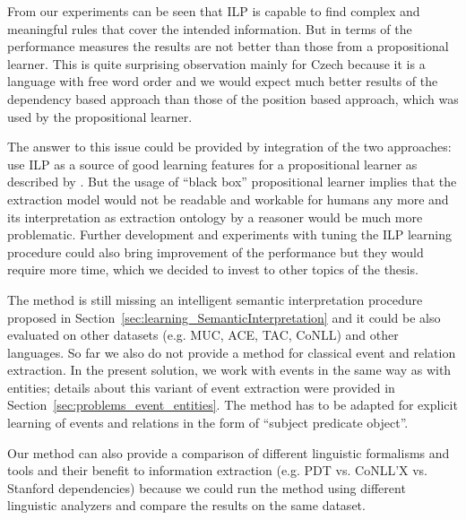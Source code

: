 From our experiments can be seen that ILP is capable to find complex and meaningful rules that cover the intended information. But in terms of the performance measures the results are not better than those from a propositional learner. This is quite surprising observation mainly for Czech because it is a language with free word order and we would expect much better results of the dependency based approach than those of the position based approach, which was used by the propositional learner.

The answer to this issue could be provided by integration of the two approaches: use ILP as a source of good learning features for a propositional learner as described by \cite{DBLP:conf/ilp/RamakrishnanJBS07}. But the usage of ``black box'' propositional learner implies that the extraction model would not be readable and workable for humans any more and its interpretation as extraction ontology by a reasoner would be much more problematic. Further development and experiments with tuning the ILP learning procedure could also bring improvement of the performance but they would require more time, which we decided to invest to other topics of the thesis.

The method is still missing an intelligent semantic interpretation procedure proposed in Section~\ref{sec:learning_SemanticInterpretation} and it could be also evaluated on other datasets (e.g. MUC, ACE, TAC, CoNLL) and other languages. So far we also do not provide a method for classical event and relation extraction. %
In the present solution, we work with events in the same way as with entities; details about this variant of event extraction were provided in Section~\ref{sec:problems_event_entities}. The method has to be adapted for explicit learning of events and relations in the form of ``subject predicate object''.

Our method can also provide a comparison of different linguistic formalisms and tools and their benefit to information extraction (e.g. PDT vs. CoNLL'X vs. Stanford dependencies) because we could run the method using different linguistic analyzers and compare the results on the same dataset.



